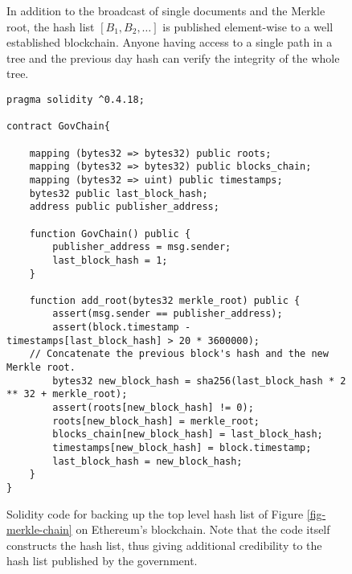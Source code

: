 \begin{figure}
\caption{In addition to the broadcast of single documents and the Merkle root, the hash list $[B_1,B_2,\dots]$ is published element-wise to a well established blockchain. Anyone having access to a single path in a tree and the previous day hash can verify the integrity of the whole tree.}
\label{fig-merkle-blockchain}
\end{figure}

\lstset{basicstyle=\footnotesize}
\lstset{
  numbers=left,
  stepnumber=1,    
  firstnumber=1,
  numberfirstline=true
}
\begin{figure*}
\begin{lstlisting}
pragma solidity ^0.4.18;

contract GovChain{

	mapping (bytes32 => bytes32) public roots;
	mapping (bytes32 => bytes32) public blocks_chain;
	mapping (bytes32 => uint) public timestamps;
	bytes32 public last_block_hash;
	address public publisher_address;

	function GovChain() public {
        publisher_address = msg.sender;
        last_block_hash = 1;
	}

	function add_root(bytes32 merkle_root) public {
        assert(msg.sender == publisher_address);
        assert(block.timestamp - timestamps[last_block_hash] > 20 * 3600000);        
	// Concatenate the previous block's hash and the new Merkle root.
        bytes32 new_block_hash = sha256(last_block_hash * 2 ** 32 + merkle_root);
       	assert(roots[new_block_hash] != 0);
        roots[new_block_hash] = merkle_root;
        blocks_chain[new_block_hash] = last_block_hash;
        timestamps[new_block_hash] = block.timestamp;
        last_block_hash = new_block_hash;
	}
}

\end{lstlisting}
\caption{Solidity code for backing up the top level hash list of Figure \ref{fig-merkle-chain} on Ethereum's blockchain. Note that the code itself constructs the hash list, thus giving additional credibility to the hash list published by the government.}
\label{contract}
\end{figure*}

